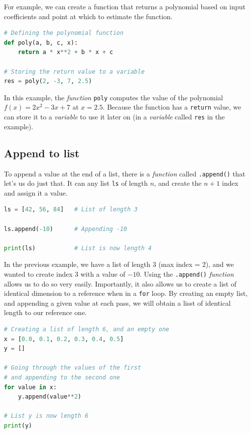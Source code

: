 \documentclass[twocolumn]{article}
\begin{document}
For example, we can create a function that returns a polynomial based on input coefficients and point at which to estimate the function.

\begin{lstlisting}[language=Python]
# Defining the polynomial function
def poly(a, b, c, x):
    return a * x**2 + b * x + c

# Storing the return value to a variable
res = poly(2, -3, 7, 2.5)
\end{lstlisting}

In this example, the \emph{function} \verb|poly| computes the value of the polynomial $f(x) = 2x^2 - 3x + 7$ at $x=2.5$. Because the function has a \verb|return| value, we can store it to a \emph{variable} to use it later on (in a \emph{variable} called \verb|res| in the example).

\subsection{Append to list}\label{app:append}

To append a value at the end of a list, there is a \emph{function} called \verb|.append()| that let's us do just that. It can any list \verb|ls| of length $n$, and create the $n+1$ index and assign it a value.

\begin{lstlisting}[language=Python]
ls = [42, 56, 84]   # List of length 3

ls.append(-10)      # Appending -10

print(ls)           # List is now length 4
\end{lstlisting}

In the previous example, we have a list of length 3 (max index = 2), and we wanted to create index 3 with a value of $-10$. Using the \verb|.append()| \emph{function} allows us to do so very easily. Importantly, it also allows us to create a list of identical dimension to a reference when in a \verb|for| loop. By creating an empty list, and appending a given value at each pass, we will obtain a lisst of identical length to our reference one.

\begin{lstlisting}[language=Python]
# Creating a list of length 6, and an empty one
x = [0.0, 0.1, 0.2, 0.3, 0.4, 0.5]
y = []

# Going through the values of the first
# and appending to the second one
for value in x:
    y.append(value**2)

# List y is now length 6
print(y)
\end{lstlisting}
\end{document}
